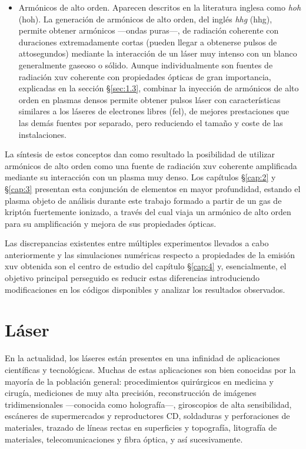 \begin{itemize}
    \item Armónicos de alto orden. Aparecen descritos en la literatura inglesa como \emph{\acrlong{hoh}} (\acrshort{hoh}). La generación de armónicos de alto orden, del inglés \emph{\acrlong{hhg}} (\acrshort{hhg}), permite obtener armónicos ---ondas puras---, de radiación coherente con duraciones extremadamente cortas (pueden llegar a obtenerse pulsos de attosegundos) mediante la interacción de un láser muy intenso con un blanco generalmente gaseoso o sólido. Aunque individualmente son fuentes de radiación \acrshort{xuv} coherente con propiedades ópticas de gran importancia, explicadas en la sección \S\ref{sec:1.3}, combinar la inyección de armónicos de alto orden en plasmas densos permite obtener pulsos láser con características similares a los láseres de electrones libres (\acrshort{fel}), de mejores prestaciones que las demás fuentes por separado, pero reduciendo el tamaño y coste de las instalaciones. 
\end{itemize}

La síntesis de estos conceptos dan como resultado la posibilidad de utilizar armónicos de alto orden como una fuente de radiación \acrshort{xuv} coherente amplificada mediante su interacción con un plasma muy denso. Los capítulos \S\ref{cap:2} y \S\ref{cap:3} presentan esta conjunción de elementos en mayor profundidad, estando el plasma objeto de análisis durante este trabajo formado a partir de un gas de kriptón fuertemente ionizado, a través del cual viaja un armónico de alto orden para su amplificación y mejora de sus propiedades ópticas. 

Las discrepancias existentes entre múltiples experimentos llevados a cabo anteriormente y las simulaciones numéricas respecto a propiedades de la emisión \acrshort{xuv} obtenida son el centro de estudio del capítulo \S\ref{cap:4} y, esencialmente, el objetivo principal perseguido es reducir estas diferencias introduciendo modificaciones en los códigos disponibles y analizar los resultados observados.

\section{Láser}\label{sec:1.1}
En la actualidad, los láseres están presentes en una infinidad de aplicaciones científicas y tecnológicas. Muchas de estas aplicaciones son bien conocidas por la mayoría de la población general: procedimientos quirúrgicos en medicina y cirugía, mediciones de muy alta precisión, reconstrucción de imágenes tridimensionales ---conocida como holografía---, giroscopios de alta sensibilidad, escáneres de supermercados y reproductores CD, soldaduras y perforaciones de materiales, trazado de líneas rectas en superficies y topografía, litografía de materiales, telecomunicaciones y fibra óptica, y así sucesivamente.

